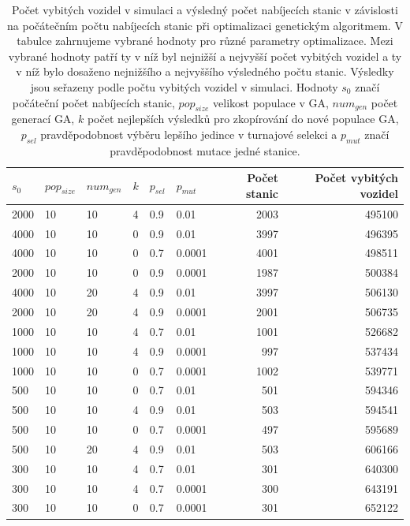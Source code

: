 \begin{table}
\centering\footnotesize\sf
\begin{tabular}{llllllrr}
\toprule
$s_0$ & $pop_{size}$ & $num_{gen}$ & $k$ & $p_{sel}$ &$p_{mut}$ & Počet stanic & Počet vybitých vozidel\\
\midrule
2000 & 10 & 10 & 4 & 0.9 & 0.01 & 2003 & 495100 \\
4000 & 10 & 10 & 0 & 0.9 & 0.01 & 3997 & 496395 \\
4000 & 10 & 10 & 0 & 0.7 & 0.0001 & 4001 & 498511 \\
2000 & 10 & 10 & 0 & 0.9 & 0.0001 & 1987 & 500384 \\
4000 & 10 & 20 & 4 & 0.9 & 0.01 & 3997 & 506130 \\
2000 & 10 & 20 & 4 & 0.9 & 0.0001 & 2001 & 506735 \\
1000 & 10 & 10 & 4 & 0.7 & 0.01 & 1001 & 526682 \\
1000 & 10 & 10 & 4 & 0.9 & 0.0001 & 997 & 537434 \\
1000 & 10 & 10 & 0 & 0.7 & 0.0001 & 1002 & 539771 \\
500 & 10 & 10 & 0 & 0.7 & 0.01 & 501 & 594346 \\
500 & 10 & 10 & 4 & 0.9 & 0.01 & 503 & 594541 \\
500 & 10 & 10 & 0 & 0.7 & 0.0001 & 497 & 595689 \\
500 & 10 & 20 & 4 & 0.9 & 0.01 & 503 & 606166 \\
300 & 10 & 10 & 4 & 0.7 & 0.01 & 301 & 640300 \\
300 & 10 & 10 & 4 & 0.7 & 0.0001 &  300 & 643191 \\
300 & 10 & 10 & 0 & 0.7 & 0.0001 & 301 & 652122 \\
\bottomrule
\end{tabular}
\caption{Počet vybitých vozidel v simulaci a výsledný počet nabíjecích stanic v 
závislosti na počátečním počtu nabíjecích stanic při optimalizaci genetickým algoritmem. 
V tabulce zahrnujeme vybrané hodnoty pro různé parametry optimalizace. Mezi vybrané 
hodnoty patří ty v níž byl nejnižší a nejvyšší počet vybitých vozidel a ty v níž bylo
dosaženo nejnižšího a nejvyššího výsledného počtu stanic.
Výsledky jsou seřazeny podle počtu vybitých vozidel v simulaci. Hodnoty $s_0$ značí
počáteční počet nabíjecích stanic, $pop_{size}$ velikost populace v GA, $num_{gen}$
počet generací GA, $k$ počet nejlepších výsledků pro zkopírování do nové
populace GA, $p_{sel}$ pravděpodobnost výběru lepšího jedince v turnajové selekci a
$p_{mut}$ značí pravděpodobnost mutace jedné stanice.}
\label{tab:vysledky_genetic}
\end{table}



